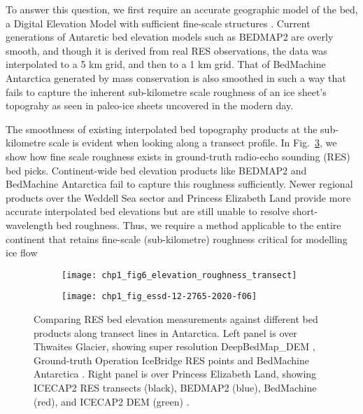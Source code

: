 To answer this question, we first require an accurate geographic model of the bed, a Digital Elevation Model with sufficient fine-scale structures \citep[Chapter 2,][]{LeongDeepBedMapdeepneural2020}. %
Current generations of Antarctic bed elevation models such as BEDMAP2 \citep{FretwellBedmap2improvedice2013} are overly smooth, and though it is derived from real \gls{RES} observations, the data was interpolated to a 5 km grid, and then to a 1 km grid.
That of BedMachine Antarctica \citep{MorlighemMEaSUREsBedMachineAntarctica2020} generated by mass conservation is also smoothed in such a way that fails to capture the inherent sub-kilometre scale roughness of an ice sheet's topograhy as seen in paleo-ice sheets uncovered in the modern day.

The smoothness of existing interpolated bed topography products at the sub-kilometre scale is evident when looking along a transect profile.
In Fig.~\ref{fig:1.2}, we show how fine scale roughness exists in ground-truth radio-echo sounding (\gls{RES}) bed picks.
Continent-wide bed elevation products like BEDMAP2 and BedMachine Antarctica fail to capture this roughness sufficiently.
Newer regional products over the Weddell Sea sector \citep{Jeofrynewbedelevation2018} and Princess Elizabeth Land \citep{CuiBedtopographyPrincess2020} provide more accurate interpolated bed elevations but are still unable to resolve short-wavelength bed roughness.
Thus, we require a method applicable to the entire continent that retains fine-scale (sub-kilometre) roughness critical for modelling ice flow \citep[see e.g.][]{HubbardSpectralroughnessglaciated2000,SiegertMacroscalebedroughness2004,BinghamDiverselandscapesPine2017,FalciniQuantifyingbedroughness2018}

\begin{figure}[htbp]
  \begin{subfigure}[t]{0.5\textwidth}
    \texttt{[image: chp1\_fig6\_elevation\_roughness\_transect]}
    \label{fig:1.2a}
  \end{subfigure}
  \hfill
  \begin{subfigure}[t]{0.5\textwidth}
    \texttt{[image: chp1\_fig\_essd-12-2765-2020-f06]}
    \label{fig:1.2b}
  \end{subfigure}
  \caption[Comparison of bed elevation products along ground-truth transects]{
    Comparing \gls{RES} bed elevation measurements against different bed products along transect lines in Antarctica.
    Left panel is over Thwaites Glacier, showing super resolution DeepBedMap\_DEM \citep[purple;][]{LeongDeepBedMapdeepneural2020}, Ground-truth Operation IceBridge \gls{RES} points \citep[orange;][]{ShiMultichannelCoherentRadar2010} and BedMachine Antarctica \citep[green;][]{MorlighemDeepglacialtroughs2019}.
    Right panel is over Princess Elizabeth Land, showing ICECAP2 \gls{RES} transects (black), BEDMAP2 (blue), BedMachine (red), and ICECAP2 DEM (green) \citep[Fig. 6 from][]{CuiBedtopographyPrincess2020}.
  }
  \label{fig:1.2}
\end{figure}

